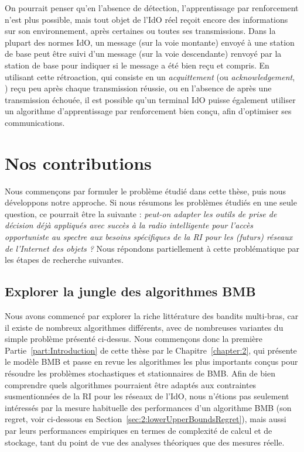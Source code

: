 \begin{resume_fr}
On pourrait penser qu'en l'absence de détection, l'apprentissage par renforcement n'est plus possible, mais tout objet de l'IdO réel reçoit encore des informations sur son environnement, après certaines ou toutes ses transmissions.
Dans la plupart des normes IdO, un message (sur la voie montante) envoyé à une station de base peut être suivi d'un message (sur la voie descendante) renvoyé par la station de base pour indiquer si le message a été bien reçu et compris.
%
En utilisant cette rétroaction, qui consiste en un \emph{acquittement} (ou \emph{acknowledgement}, \Ack) reçu peu après chaque transmission réussie, ou en l'absence de \Ack{} après une transmission échouée, il est possible qu'un terminal IdO puisse également utiliser un algorithme d'apprentissage par renforcement bien conçu, afin d'optimiser ses communications.



\section*{Nos contributions}

Nous commençons par formuler le problème étudié dans cette thèse, puis nous développons notre approche.
%
Si nous résumons les problèmes étudiés en une seule question, ce pourrait être la suivante :
\emph{peut-on adapter les outils de prise de décision déjà appliqués avec succès à la radio intelligente pour l'accès opportuniste au spectre aux besoins spécifiques de la RI pour les (futurs) réseaux de l'Internet des objets ?}
%
Nous répondons partiellement à cette problématique par les étapes de recherche suivantes.



\subsection*{Explorer la jungle des algorithmes BMB}

%
Nous avons commencé par explorer la riche littérature des bandits multi-bras,
car il existe de nombreux algorithmes différents, avec de nombreuses variantes du simple problème présenté ci-dessus.
Nous commençons donc la première Partie~\ref{part:Introduction} de cette thèse par le Chapitre~\ref{chapter:2}, qui présente le modèle BMB et passe en revue les algorithmes les plus importants conçus pour résoudre les problèmes stochastiques et stationnaires de BMB.
%
Afin de bien comprendre quels algorithmes pourraient être adaptés aux contraintes susmentionnées de la RI pour les réseaux de l'IdO,
nous n'étions pas seulement intéressés par la mesure habituelle des performances d'un algorithme BMB (son regret, voir ci-dessous en Section~\ref{sec:2:lowerUpperBoundsRegret}),
mais aussi par leurs performances empiriques en termes de complexité de calcul et de stockage, tant du point de vue des analyses théoriques que des mesures réelle.



\end{resume_fr}
